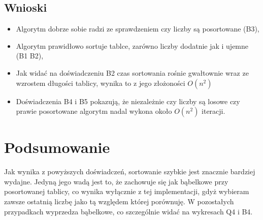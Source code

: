 \documentclass[11pt]{article}
\providecommand{\tightlist}{%
      \setlength{\itemsep}{0pt}\setlength{\parskip}{0pt}}
\begin{document}
    \hypertarget{wnioski}{%
\subsection{Wnioski}\label{wnioski}}

\begin{itemize}
\tightlist
\item
  Algorytm dobrze sobie radzi ze sprawdzeniem czy liczby są posortowane
  (B3),
\item
  Algorytm prawidłowo sortuje tablce, zarówno liczby dodatnie jak i
  ujemne (B1 B2),
\item
  Jak widać na doświadczeniu B2 czas sortowania rośnie gwałtownie wraz
  ze wzrostem długości tablicy, wynika to z jego złożoności \(O(n^{2})\)
\item
  Doświadczenia B4 i B5 pokazują, że niezależnie czy liczby są losowe
  czy prawie posortowane algorytm nadal wykona około \(O(n^{2})\)
  iteracji.
\end{itemize}

    \hypertarget{podsumowanie}{%
\section{Podsumowanie}\label{podsumowanie}}

    Jak wynika z powyższych doświadczeń, sortowanie szybkie jest znacznie
bardziej wydajne. Jedyną jego wadą jest to, że zachowuje się jak
bąbelkowe przy posortowanej tablicy, co wynika wyłącznie z tej
implementacji, gdyż wybieram zawsze ostatnią liczbę jako tą względem
której porównuję. W pozostałych przypadkach wyprzedza bąbelkowe, co
szczególnie widać na wykresach Q4 i B4.


    
    
    
\end{document}
